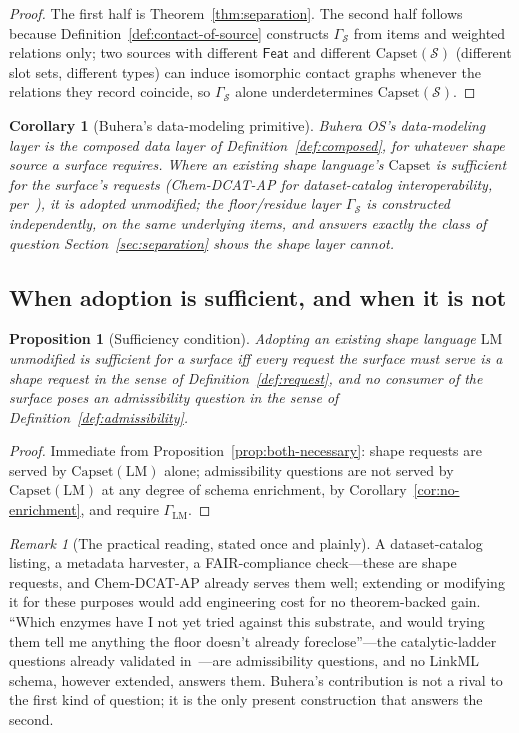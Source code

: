 \documentclass[11pt,a4paper,twocolumn]{article}
\newtheorem{corollary}[theorem]{Corollary}
\newtheorem{proposition}[theorem]{Proposition}
\theoremstyle{definition}
\theoremstyle{remark}
\newtheorem{remark}[theorem]{Remark}
\newcommand{\Feat}{\mathsf{Feat}}
\newcommand{\Capset}{\mathrm{Capset}}
\newcommand{\Src}{\mathcal{S}}
\newcommand{\Gph}{\Gamma}
\newcommand{\LM}{\mathrm{LM}}
\begin{document}
\begin{proof}
The first half is Theorem~\ref{thm:separation}. The second half follows because
Definition~\ref{def:contact-of-source} constructs $\Gph_\Src$ from items and
weighted relations only; two sources with different $\Feat$ and different
$\Capset(\Src)$ (different slot sets, different types) can induce
isomorphic contact graphs whenever the relations they record coincide, so
$\Gph_\Src$ alone underdetermines $\Capset(\Src)$.
\end{proof}

\begin{corollary}[Buhera's data-modeling primitive]
\label{cor:buhera-primitive}
Buhera OS's data-modeling layer is the composed data layer of
Definition~\ref{def:composed}, for whatever shape source a surface requires. Where
an existing shape language's $\Capset$ is sufficient for the surface's requests
(Chem-DCAT-AP for dataset-catalog interoperability, per~\cite{linkml}), it is
adopted unmodified; the floor/residue layer $\Gph_\Src$ is constructed
independently, on the same underlying items, and answers exactly the class of
question Section~\ref{sec:separation} shows the shape layer cannot.
\end{corollary}

\subsection{When adoption is sufficient, and when it is not}

\begin{proposition}[Sufficiency condition]
\label{prop:sufficiency}
Adopting an existing shape language $\LM$ unmodified is sufficient for a surface
iff every request the surface must serve is a shape request in the sense of
Definition~\ref{def:request}, and no consumer of the surface poses an
admissibility question in the sense of Definition~\ref{def:admissibility}.
\end{proposition}

\begin{proof}
Immediate from Proposition~\ref{prop:both-necessary}: shape requests are served
by $\Capset(\LM)$ alone; admissibility questions are not served by
$\Capset(\LM)$ at any degree of schema enrichment, by
Corollary~\ref{cor:no-enrichment}, and require $\Gph_\LM$.
\end{proof}

\begin{remark}[The practical reading, stated once and plainly]
A dataset-catalog listing, a metadata harvester, a FAIR-compliance check---these
are shape requests, and Chem-DCAT-AP already serves them well; extending or
modifying it for these purposes would add engineering cost for no theorem-backed
gain. ``Which enzymes have I not yet tried against this substrate, and would
trying them tell me anything the floor doesn't already foreclose''---the
catalytic-ladder questions already validated
in~\cite{ladder}---are admissibility questions, and no LinkML schema, however
extended, answers them. Buhera's contribution is not a rival to the first kind of
question; it is the only present construction that answers the second.
\end{remark}
\end{document}
